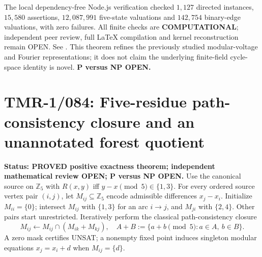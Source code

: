 \documentclass[11pt]{article}
\begin{document}
The local dependency-free Node.js verification checked $1{,}127$
directed instances, $15{,}580$ assertions,
$12{,}087{,}991$ five-state valuations and $142{,}754$
binary-edge valuations, with zero failures.  All finite checks
are \textbf{COMPUTATIONAL}; independent peer review, full \LaTeX{}
compilation and kernel reconstruction remain OPEN.  See
.
This theorem refines the previously studied modular-voltage
and Fourier representations; it does not claim the underlying
finite-field cycle-space identity is novel.
\textbf{P versus NP OPEN.}



\section{TMR-1/084: Five-residue path-consistency closure and an unannotated forest quotient}
\noindent\textbf{Status: PROVED positive exactness theorem; independent mathematical review OPEN; P versus NP OPEN.}
Use the canonical source on $\mathbb Z_5$ with $R(x,y)$ iff
$y-x\pmod 5\in\{1,3\}$. For every ordered source vertex pair $(i,j)$,
let $M_{ij}\subseteq\mathbb Z_5$ encode admissible differences $x_j-x_i$.
Initialize $M_{ii}=\{0\}$; intersect $M_{ij}$ with $\{1,3\}$ for
an arc $i\to j$, and $M_{ji}$ with $\{2,4\}$. Other pairs start
unrestricted. Iteratively perform the classical path-consistency
closure
\[
  M_{ij}\longleftarrow M_{ij}\cap(M_{ik}+M_{kj}),
  \quad
  A+B:=\{a+b\pmod5:a\in A,\ b\in B\}.
\]
A zero mask certifies UNSAT; a nonempty fixed point induces
singleton modular equations $x_j=x_i+d$ when $M_{ij}=\{d\}$.
\end{document}
